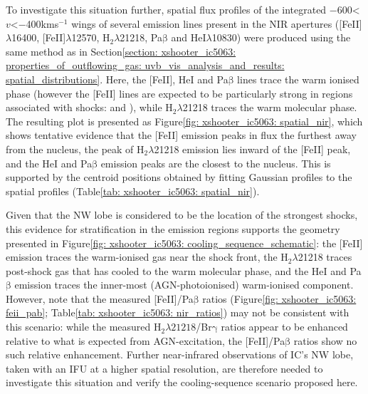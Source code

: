 To investigate this situation further, spatial flux profiles of the integrated \mbox{$-$600\;\;\textless\;$v$\;\textless\;$-$400\;km\;s$^{-1}$} wings of several emission lines present in the NIR apertures ([FeII]$\lambda$16400, [FeII]$\lambda$12570, H$_\mathrm{2}\lambda$21218, Pa$\mathrm{\beta}$ and HeI$\lambda$10830) were produced using the same method as in Section\;\ref{section: xshooter_ic5063: properties_of_outflowing_gas: uvb_vis_analysis_and_results: spatial_distributions}. Here, the [FeII], HeI and Pa$\mathrm{\beta}$ lines trace the warm ionised phase (however the [FeII] lines are expected to be particularly strong in regions associated with shocks: \citealt{Dors2012} and \citealt{Riffel2013a}), while H$_\mathrm{2}\lambda$21218 traces the warm molecular phase. The resulting plot is presented as Figure\;\ref{fig: xshooter_ic5063: spatial_nir}, which shows tentative evidence that the [FeII] emission peaks in flux the furthest away from the nucleus, the peak of H$_\mathrm{2}\lambda$21218 emission lies inward of the [FeII] peak, and the HeI and Pa$\mathrm{\beta}$ emission peaks are the closest to the nucleus. This is supported by the centroid positions obtained by fitting Gaussian profiles to the spatial profiles (Table\;\ref{tab: xshooter_ic5063: spatial_nir}).

Given that the NW lobe is considered to be the location of the strongest shocks, this evidence for stratification in the emission regions supports the geometry presented in Figure\;\ref{fig: xshooter_ic5063: cooling_sequence_schematic}: the [FeII] emission traces the warm-ionised gas near the shock front, the H$_\mathrm{2}\lambda$21218 traces post-shock gas that has cooled to the warm molecular phase, and the HeI and Pa$\mathrm{\beta}$ emission traces the inner-most (AGN-photoionised) warm-ionised component. However, note that the measured [FeII]/Pa$\mathrm{\beta}$ ratios (Figure\;\ref{fig: xshooter_ic5063: feii_pab}; Table\;\ref{tab: xshooter_ic5063: nir_ratios}) may not be consistent with this scenario: while the measured H$_\mathrm{2}\lambda21218$/Br$\mathrm{\gamma}$ ratios appear to be enhanced relative to what is expected from AGN-excitation, the [FeII]/Pa$\mathrm{\beta}$ ratios show no such relative enhancement. Further near-infrared observations of IC's NW lobe, taken with an IFU at a higher spatial resolution, are therefore needed to investigate this situation and verify the cooling-sequence scenario proposed here.

